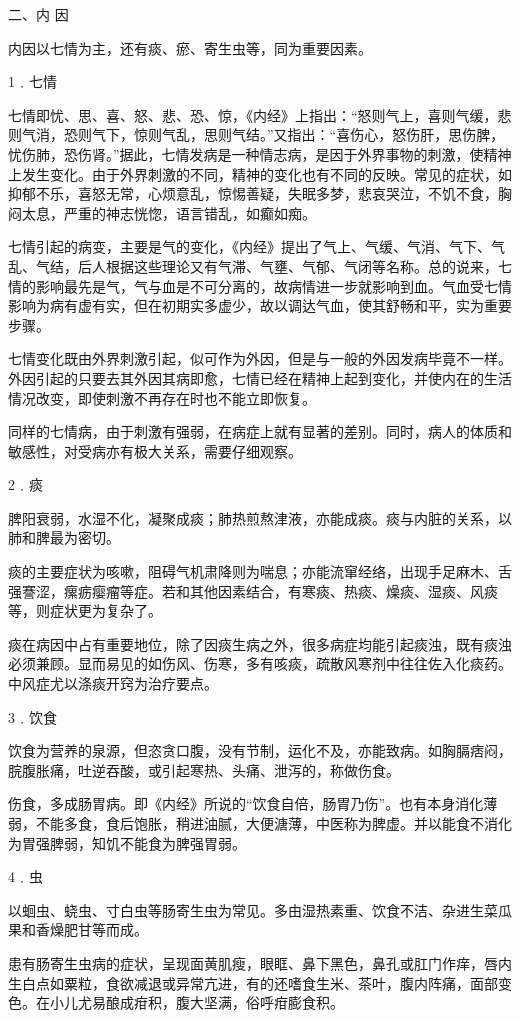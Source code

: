 \documentclass[a4paper,12pt,UTF8,twoside]{ctexbook}
\begin{document}
二、内 因

内因以七情为主，还有痰、瘀、寄生虫等，同为重要因素。

1﹒七情

七情即忧、思、喜、怒、悲、恐、惊，《内经》上指出：“怒则气上，喜则气缓，悲则气消，恐则气下，惊则气乱，思则气结。”又指出：“喜伤心，怒伤肝，思伤脾，忧伤肺，恐伤肾。”据此，七情发病是一种情志病，是因于外界事物的刺激，使精神上发生变化。由于外界刺激的不同，精神的变化也有不同的反映。常见的症状，如抑郁不乐，喜怒无常，心烦意乱，惊惕善疑，失眠多梦，悲哀哭泣，不饥不食，胸闷太息，严重的神志恍惚，语言错乱，如癫如痴。

七情引起的病变，主要是气的变化，《内经》提出了气上、气缓、气消、气下、气乱、气结，后人根据这些理论又有气滞、气壅、气郁、气闭等名称。总的说来，七情的影响最先是气，气与血是不可分离的，故病情进一步就影响到血。气血受七情影响为病有虚有实，但在初期实多虚少，故以调达气血，使其舒畅和平，实为重要步骤。

七情变化既由外界刺激引起，似可作为外因，但是与一般的外因发病毕竟不一样。外因引起的只要去其外因其病即愈，七情已经在精神上起到变化，并使内在的生活情况改变，即使刺激不再存在时也不能立即恢复。

同样的七情病，由于刺激有强弱，在病症上就有显著的差别。同时，病人的体质和敏感性，对受病亦有极大关系，需要仔细观察。

2﹒痰

脾阳衰弱，水湿不化，凝聚成痰；肺热煎熬津液，亦能成痰。痰与内脏的关系，以肺和脾最为密切。

痰的主要症状为咳嗽，阻碍气机肃降则为喘息；亦能流窜经络，出现手足麻木、舌强謇涩，瘰疬瘿瘤等症。若和其他因素结合，有寒痰、热痰、燥痰、湿痰、风痰等，则症状更为复杂了。

痰在病因中占有重要地位，除了因痰生病之外，很多病症均能引起痰浊，既有痰浊必须兼顾。显而易见的如伤风、伤寒，多有咳痰，疏散风寒剂中往往佐入化痰药。中风症尤以涤痰开窍为治疗要点。

3﹒饮食

饮食为营养的泉源，但恣贪口腹，没有节制，运化不及，亦能致病。如胸膈痞闷，脘腹胀痛，吐逆吞酸，或引起寒热、头痛、泄泻的，称做伤食。

伤食，多成肠胃病。即《内经》所说的“饮食自倍，肠胃乃伤”。也有本身消化薄弱，不能多食，食后饱胀，稍进油腻，大便溏薄，中医称为脾虚。并以能食不消化为胃强脾弱，知饥不能食为脾强胃弱。

4﹒虫

以蛔虫、蛲虫、寸白虫等肠寄生虫为常见。多由湿热素重、饮食不洁、杂进生菜瓜果和香燥肥甘等而成。

患有肠寄生虫病的症状，呈现面黄肌瘦，眼眶、鼻下黑色，鼻孔或肛门作痒，唇内生白点如粟粒，食欲减退或异常亢进，有的还嗜食生米、茶叶，腹内阵痛，面部变色。在小儿尤易酿成疳积，腹大坚满，俗呼疳膨食积。
\end{document}
